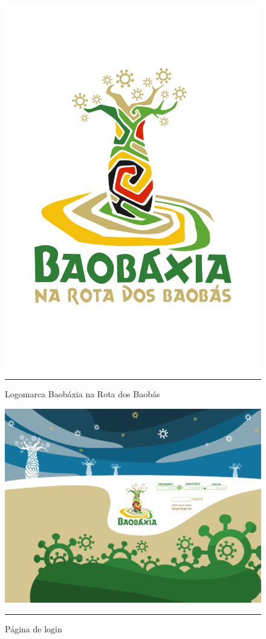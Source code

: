 \begin{figure}[htbp]
  \centering
  \includegraphics[width=\textwidth]{./Fig/Logo_BBX_Na_Rota.pdf}
  \rule{35em}{0.5pt}
  \caption[Logomarca Baobáxia na Rota dos Baobás]{
    Logomarca Baobáxia na Rota dos Baobás}
  \label{fig:Logo_BBX_Na_Rota}
\end{figure}

\begin{figure}[htbp]
  \centering
  \includegraphics[width=\textwidth]{./Fig/layout-login.pdf}
  \rule{35em}{0.5pt}
  \caption[Página de login]{Página de login}
  \label{fig:layout-login}
\end{figure}

